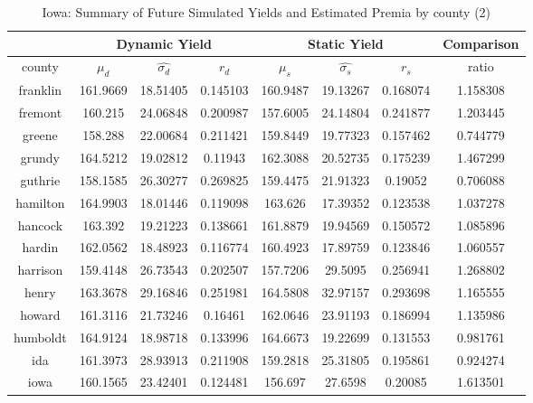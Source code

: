 \begin{table}[H]\centering
\caption{Iowa: Summary of Future Simulated Yields and Estimated Premia by county (2)}
\label{my-label}
\begin{tabular}{|c|ccc|ccc|c|}

\hline
\multicolumn{1}{|c}{} & \multicolumn{3}{|c}{Dynamic Yield} & \multicolumn{3}{|c}{Static Yield} & \multicolumn{1}{|c|}{Comparison}\\ 
\hline
county        & $\mu_d$ & $\hat{\sigma_d}$ & $r_d$ & $\mu_s$ & $\hat{\sigma_s}$ & $r_s$ & ratio \\
\hline


franklin      & 161.9669 & 18.51405       & 0.145103 & 160.9487 & 19.13267       & 0.168074 & 1.158308 \\
fremont       & 160.215  & 24.06848       & 0.200987 & 157.6005 & 24.14804       & 0.241877 & 1.203445 \\
greene        & 158.288  & 22.00684       & 0.211421 & 159.8449 & 19.77323       & 0.157462 & 0.744779 \\
grundy        & 164.5212 & 19.02812       & 0.11943  & 162.3088 & 20.52735       & 0.175239 & 1.467299 \\
guthrie       & 158.1585 & 26.30277       & 0.269825 & 159.4475 & 21.91323       & 0.19052  & 0.706088 \\
hamilton      & 164.9903 & 18.01446       & 0.119098 & 163.626  & 17.39352       & 0.123538 & 1.037278 \\
hancock       & 163.392  & 19.21223       & 0.138661 & 161.8879 & 19.94569       & 0.150572 & 1.085896 \\
hardin        & 162.0562 & 18.48923       & 0.116774 & 160.4923 & 17.89759       & 0.123846 & 1.060557 \\
harrison      & 159.4148 & 26.73543       & 0.202507 & 157.7206 & 29.5095        & 0.256941 & 1.268802 \\
henry         & 163.3678 & 29.16846       & 0.251981 & 164.5808 & 32.97157       & 0.293698 & 1.165555 \\
howard        & 161.3116 & 21.73246       & 0.16461  & 162.0646 & 23.91193       & 0.186994 & 1.135986 \\
humboldt      & 164.9124 & 18.98718       & 0.133996 & 164.6673 & 19.22699       & 0.131553 & 0.981761 \\
ida           & 161.3973 & 28.93913       & 0.211908 & 159.2818 & 25.31805       & 0.195861 & 0.924274 \\
iowa          & 160.1565 & 23.42401       & 0.124481 & 156.697  & 27.6598        & 0.20085  & 1.613501 \\

\end{tabular}
\end{table}
